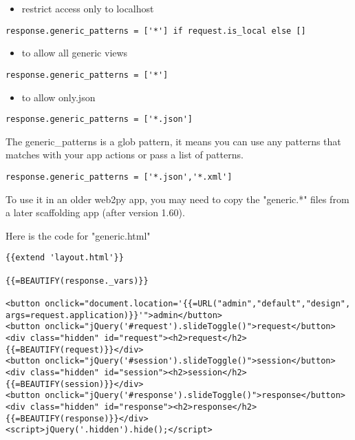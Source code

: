 \documentclass[justified,sixbynine,notoc]{tufte-book}
\begin{document}
\begin{fullwidth}
\begin{itemize}
\item restrict access only to localhost
\end{itemize}
\begin{lstlisting}
response.generic_patterns = ['*'] if request.is_local else []
\end{lstlisting}

\begin{itemize}
\item to allow all generic views
\end{itemize}
\begin{lstlisting}
response.generic_patterns = ['*']
\end{lstlisting}

\begin{itemize}
\item to allow only.json
\end{itemize}

\begin{lstlisting}
response.generic_patterns = ['*.json']
\end{lstlisting}

The generic\_patterns is a glob pattern, it means you can use any patterns that matches with your app actions or pass a list of patterns.

\begin{lstlisting}
response.generic_patterns = ['*.json','*.xml']
\end{lstlisting}

To use it in an older web2py app, you may need to copy the "generic.*" files from a later scaffolding app (after version 1.60).

Here is the code for "generic.html"
\begin{lstlisting}[keywords={}]
{{extend 'layout.html'}}

{{=BEAUTIFY(response._vars)}}

<button onclick="document.location='{{=URL("admin","default","design",
args=request.application)}}'">admin</button>
<button onclick="jQuery('#request').slideToggle()">request</button>
<div class="hidden" id="request"><h2>request</h2>{{=BEAUTIFY(request)}}</div>
<button onclick="jQuery('#session').slideToggle()">session</button>
<div class="hidden" id="session"><h2>session</h2>{{=BEAUTIFY(session)}}</div>
<button onclick="jQuery('#response').slideToggle()">response</button>
<div class="hidden" id="response"><h2>response</h2>{{=BEAUTIFY(response)}}</div>
<script>jQuery('.hidden').hide();</script>
\end{lstlisting}


\end{fullwidth}
\end{document}
